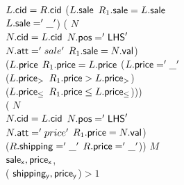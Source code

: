 {\begin{example}
\begin{footnotesize}
{ \>  $L.\at{cid}=R.\at{cid}$  ($L.\at{sale}$  $R_1.\at{sale}=L.\at{sale}$\\
 \> \>  $L.\at{sale}='\_'$)  (  $N$\\
 \> \> \>  $N.\at{cid}=L.\at{cid}$  $N.\at{pos}='\LHS'$  \\
 \> \> \> $N.\at{att}='sale'$  $R_{1}.\at{sale}=N.\at{val}$)  \\
 \>\> ($L.\at{price}$  $R_1.\at{price}=L.\at{price}$  ($L.\at{price}='\_'$  \\
 \> \>  ($L.\at{price_>}$  $R_1.\at{price}>L.\at{price_>}$)  \\
 \> \>  ($L.\at{price_\leq}$  $R_1.\at{price}\leq L.\at{price_\leq}$))) \\
 \> \>  ( $N$ \\
 \>\>\>  $N.\at{cid}=L.\at{cid}$  $N.\at{pos}='\LHS'$  \\
 \> \> \> $N.\at{att}='price'$  $R_{1}.\at{price}=N.\at{val}$) \\

 \> \> ($R.\at{shipping}='\_'$ $R.\at{price}='\_'$))  $M$ \\
 \> \>  $\at{sale_x}, \at{price_x}$,  \\
 \> \> \>  ( $\at{shipping_y}, \at{price_y}$)$>1$ }
\end{footnotesize}
\end{example}
}